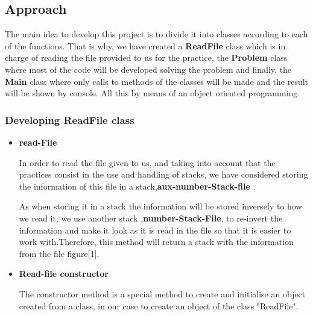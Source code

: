 \documentclass[a4paper]{article}
\theoremstyle{plain}
\theoremstyle{definition}
\begin{document}
     \subsection{Approach}
        The main idea to develop this project is to divide it into classes according to each of the functions. That is why, we have created a \textbf{ReadFile} class which is in charge of reading the file provided to us for the practice, the \textbf{Problem} class where most of the code will be developed solving the problem and finally, the \textbf{Main} class where only calls to methods of the classes will be made and the result will be shown by console. All this by means of an object oriented programming.


        \subsubsection{Developing ReadFile class}
        \begin{itemize}
            \item \textbf{read-File}\par
            In order to read the file given to us, and taking into account that the practices consist in the use and handling of stacks, we have considered storing the information of this file in a stack,\textbf{aux-number-Stack-file }.

             As when storing it in a stack the information will be stored inversely to how we read it, we use another stack ,\textbf{number-Stack-File}, to re-invert the information and make it look as it is read in the file so that it is easier to work with.Therefore, this method will return a stack with the information from the file figure[1].\newline
             \item \textbf{Read-file constructor}\par
           The constructor method is a special method to create and initialise an object created from a class, in our case to create an object of the class "ReadFile".
        \end{itemize}
        
\end{document}
